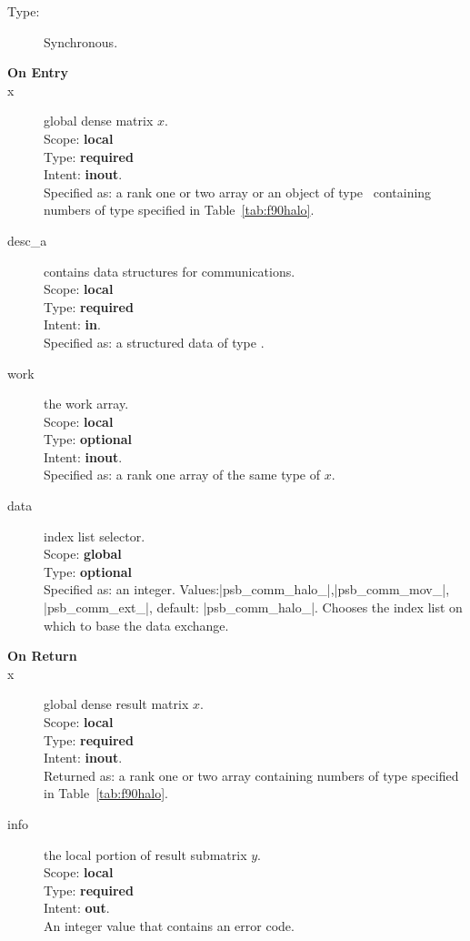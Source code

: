 \begin{description}
\item[Type:] Synchronous.
\item[\bf On Entry]
\item[x] global dense matrix $x$.\\
Scope: {\bf local} \\
Type: {\bf required} \\
Intent: {\bf inout}.\\
Specified as:  a rank one or two array or an object of type \vdata\ 
containing numbers of type specified in
Table~\ref{tab:f90halo}.
\item[desc\_a] contains data structures for communications.\\
Scope: {\bf local} \\
Type: {\bf required}\\
Intent: {\bf in}.\\
Specified as: a structured data of type \descdata.
\item[work] the work array. \\
Scope: {\bf local} \\
Type: {\bf optional}\\
Intent: {\bf inout}.\\
Specified as: a rank one array of the same type of $x$. 
\item[data] index list selector.\\
Scope: {\bf global} \\
Type: {\bf optional} \\
Specified as: an integer. Values:\fortinline|psb_comm_halo_|,\fortinline|psb_comm_mov_|,
\fortinline|psb_comm_ext_|, default: \fortinline|psb_comm_halo_|. Chooses the
index list on which to base the data exchange. 


\item[\bf On Return] 
\item[x] global dense result matrix $x$.\\
Scope: {\bf local} \\
Type: {\bf required} \\
Intent: {\bf inout}.\\
Returned as:  a rank one or two array 
containing numbers of type specified in
Table~\ref{tab:f90halo}.
\item[info] the local portion of result submatrix $y$.\\
Scope: {\bf local} \\
Type: {\bf required} \\
Intent: {\bf out}.\\
An integer value that contains an error code. 
\end{description}
